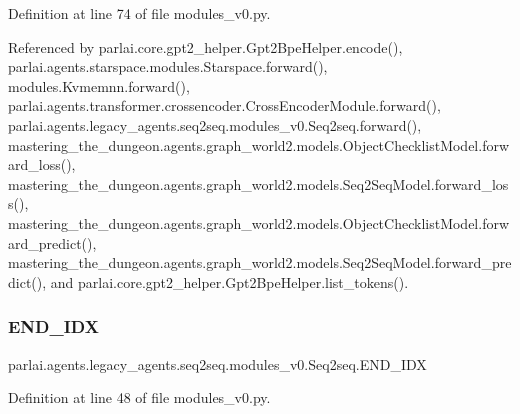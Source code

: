 Definition at line 74 of file modules\+\_\+v0.\+py.



Referenced by parlai.\+core.\+gpt2\+\_\+helper.\+Gpt2\+Bpe\+Helper.\+encode(), parlai.\+agents.\+starspace.\+modules.\+Starspace.\+forward(), modules.\+Kvmemnn.\+forward(), parlai.\+agents.\+transformer.\+crossencoder.\+Cross\+Encoder\+Module.\+forward(), parlai.\+agents.\+legacy\+\_\+agents.\+seq2seq.\+modules\+\_\+v0.\+Seq2seq.\+forward(), mastering\+\_\+the\+\_\+dungeon.\+agents.\+graph\+\_\+world2.\+models.\+Object\+Checklist\+Model.\+forward\+\_\+loss(), mastering\+\_\+the\+\_\+dungeon.\+agents.\+graph\+\_\+world2.\+models.\+Seq2\+Seq\+Model.\+forward\+\_\+loss(), mastering\+\_\+the\+\_\+dungeon.\+agents.\+graph\+\_\+world2.\+models.\+Object\+Checklist\+Model.\+forward\+\_\+predict(), mastering\+\_\+the\+\_\+dungeon.\+agents.\+graph\+\_\+world2.\+models.\+Seq2\+Seq\+Model.\+forward\+\_\+predict(), and parlai.\+core.\+gpt2\+\_\+helper.\+Gpt2\+Bpe\+Helper.\+list\+\_\+tokens().

\mbox{\label{classparlai_1_1agents_1_1legacy__agents_1_1seq2seq_1_1modules__v0_1_1Seq2seq_a8edf86af4ee5f4f86402171fcf3b295f}} 
\subsubsection{\texorpdfstring{E\+N\+D\+\_\+\+I\+DX}{END\_IDX}}
{\footnotesize\ttfamily parlai.\+agents.\+legacy\+\_\+agents.\+seq2seq.\+modules\+\_\+v0.\+Seq2seq.\+E\+N\+D\+\_\+\+I\+DX}



Definition at line 48 of file modules\+\_\+v0.\+py.



